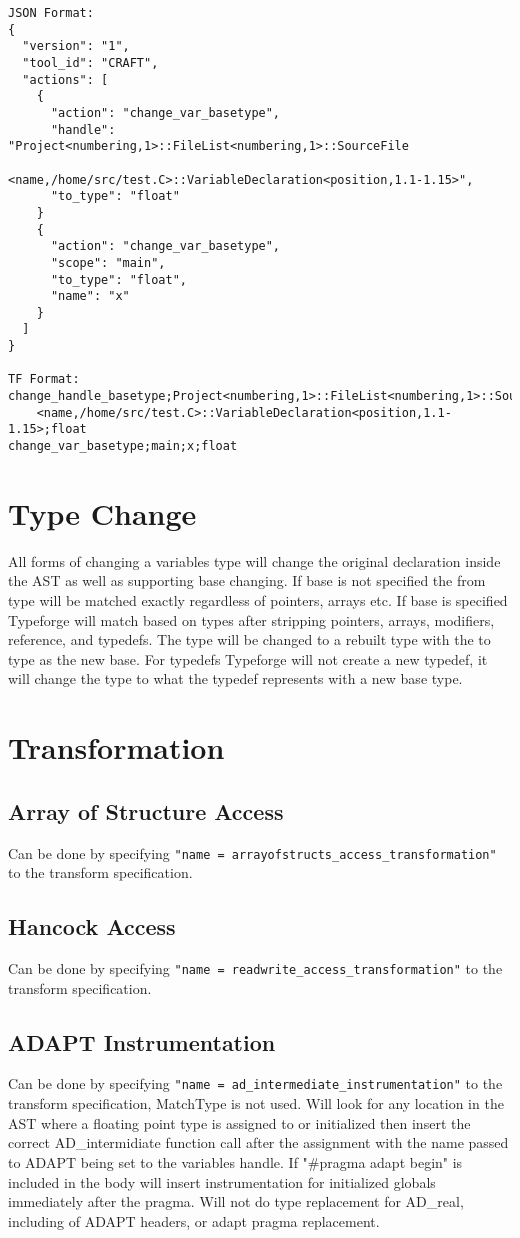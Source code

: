 \documentclass[natbib]{article}
\begin{document}
\begin{verbatim}
JSON Format:
{
  "version": "1",
  "tool_id": "CRAFT",
  "actions": [
  	{
  	  "action": "change_var_basetype",
  	  "handle": "Project<numbering,1>::FileList<numbering,1>::SourceFile
                  <name,/home/src/test.C>::VariableDeclaration<position,1.1-1.15>",
      "to_type": "float"
    }
    {
  	  "action": "change_var_basetype",
      "scope": "main",
      "to_type": "float",
      "name": "x"
    }
  ]
}

TF Format:
change_handle_basetype;Project<numbering,1>::FileList<numbering,1>::SourceFile
    <name,/home/src/test.C>::VariableDeclaration<position,1.1-1.15>;float
change_var_basetype;main;x;float
\end{verbatim}

\section{Type Change} \label{change}
All forms of changing a variables type will change the original declaration inside the AST 
as well as supporting base changing. If base is not specified the from type will be matched 
exactly regardless of pointers, arrays etc. If base is specified Typeforge will match based 
on types after stripping pointers, arrays, modifiers, reference, and typedefs. The type will 
be changed to a rebuilt type with the to type as the new base. For typedefs Typeforge will 
not create a new typedef, it will change the type to what the typedef represents with a 
new base type.

\section{Transformation} \label{transform}
\subsection{Array of Structure Access}
Can be done by specifying \verb+"name = arrayofstructs_access_transformation"+ to the transform 
specification.
\subsection{Hancock Access}
Can be done by specifying \verb+"name = readwrite_access_transformation"+ to the transform 
specification.
\subsection{ADAPT Instrumentation}
Can be done by specifying \verb+"name = ad_intermediate_instrumentation"+ to the transform 
specification, MatchType is not used. Will look for any location in the AST where a floating 
point type is assigned to or initialized then insert the correct AD\_intermidiate function 
call after the assignment with the name passed to ADAPT being set to the variables handle. 
If "\#pragma adapt begin" is included in the body will insert instrumentation for initialized 
globals immediately after the pragma. Will not do type replacement for AD\_real, including 
of ADAPT headers, or adapt pragma replacement.
\end{document}
